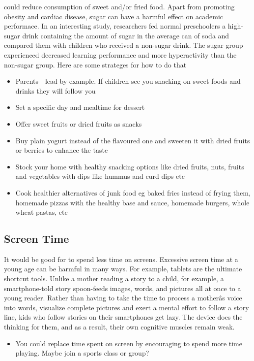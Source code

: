 \documentclass[]{article}
\providecommand{\tightlist}{%
  \setlength{\itemsep}{0pt}\setlength{\parskip}{0pt}}
\begin{document}
could reduce consumption of sweet and/or fried food. Apart from
promoting obesity and cardiac disease, sugar can have a harmful effect
on academic performace. In an interesting study, researchers fed normal
preschoolers a high-sugar drink containing the amount of sugar in the
average can of soda and compared them with children who received a
non-sugar drink. The sugar group experienced decreased learning
performance and more hyperactivity than the non-sugar group. Here are
some strateges for how to do that

\begin{itemize}
\item
  Parents - lead by example. If children see you snacking on sweet foods
  and drinks they will follow you
\item
  Set a specific day and mealtime for dessert
\item
  Offer sweet fruits or dried fruits as snacks
\item
  Buy plain yogurt instead of the flavoured one and sweeten it with
  dried fruits or berries to enhance the taste
\item
  Stock your home with healthy snacking options like dried fruits, nuts,
  fruits and vegetables with dips like hummus and curd dips etc
\item
  Cook healthier alternatives of junk food eg baked fries instead of
  frying them, homemade pizzas with the healthy base and sauce, homemade
  burgers, whole wheat pastas, etc
\end{itemize}

\subsection{Screen Time}\label{screen-time}

It would be good for to spend less time on screens. Excessive screen
time at a young age can be harmful in many ways. For example, tablets
are the ultimate shortcut tools. Unlike a mother reading a story to a
child, for example, a smartphone-told story spoon-feeds images, words,
and pictures all at once to a young reader. Rather than having to take
the time to process a motherâs voice into words, visualize complete
pictures and exert a mental effort to follow a story line, kids who
follow stories on their smartphones get lazy. The device does the
thinking for them, and as a result, their own cognitive muscles remain
weak.

\begin{itemize}
\tightlist
\item
  You could replace time spent on screen by encouraging to spend more
  time playing. Maybe join a sports class or group?
\end{itemize}
\end{document}
